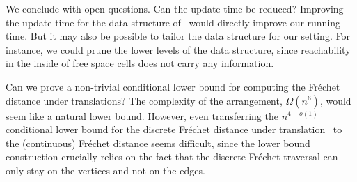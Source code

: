 \documentclass[thm-restate]{lipics-v2021}
\theoremstyle{remark}
\begin{document}
We conclude with open questions. Can the update time be reduced? Improving the update time for the data structure of~\cite{bringmannFrechetDistanceTranslation2021} would directly improve our running time. But it may also be possible to tailor the data structure for our setting. For instance, we could prune the lower levels of the data structure, since reachability in the inside of free space cells does not carry any information.

Can we prove a non-trivial conditional lower bound for computing the Fr\'echet distance under translations? The complexity of the arrangement, $\Omega(n^6)$, would seem like a natural lower bound. However, even transferring the $n^{4-o(1)}$ conditional lower bound for the discrete Fr\'echet distance under translation~\cite{bringmannFrechetDistanceTranslation2021} to the (continuous) Fr\'echet distance seems difficult, since the lower bound construction crucially relies on the fact that the discrete Fréchet traversal can only stay on the vertices and not on the edges.


 
\end{document}
